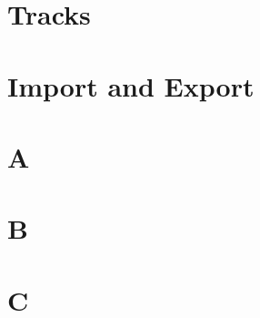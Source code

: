 \documentclass[openany]{book}
\begin{document}
\chapter{Tracks}
















\chapter{Import and Export}






















\chapter{A}






%

\chapter{B}


\chapter{C}

\end{document}
